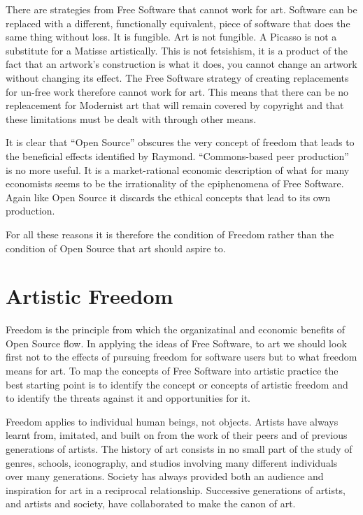 \documentclass[11pt, a4]{article}
\begin{document}
There are strategies from Free Software that cannot work for art. Software can be replaced with a different, functionally equivalent, piece of software that does the same thing without loss. It is fungible. Art is not fungible. A Picasso is not a substitute for a Matisse artistically. This is not fetsishism, it is a product of the fact that an artwork's construction is what it does, you cannot change an artwork without changing its effect. The Free Software strategy of creating replacements for un-free work therefore cannot work for art. This means that there can be no repleacement for Modernist art that will remain covered by copyright and that these limitations must be dealt with through other means.

It is clear that ``Open Source'' obscures the very concept of freedom that leads to the beneficial effects identified by Raymond. ``Commons-based peer production'' is no more useful. It is a market-rational economic description of what for many economists seems to be the irrationality of the epiphenomena of Free Software. Again like Open Source it discards the ethical concepts that lead to its own production.

For all these reasons it is therefore the condition of Freedom rather than the condition of Open Source that art should aspire to.


\section{Artistic Freedom}

Freedom is the principle from which the organizatinal and economic benefits of Open Source flow. In applying the ideas of Free Software, to art we should look first not to the effects of pursuing freedom for software users but to what freedom means for art. To map the concepts of Free Software into artistic practice the best starting point is to identify the concept or concepts of artistic freedom and to identify the threats against it and opportunities for it.

Freedom applies to individual human beings, not objects. Artists have always learnt from, imitated, and built on from the work of their peers and of previous generations of artists. The history of art consists in no small part of the study of genres, schools, iconography, and studios involving many different individuals over many generations. Society has always provided both an audience and inspiration for art in a reciprocal relationship. Successive generations of artists, and artists and society, have collaborated to make the canon of art.
\end{document}
